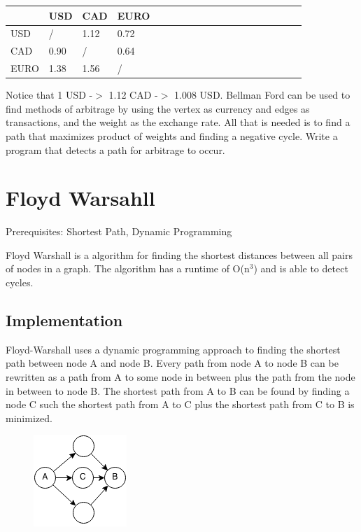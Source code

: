 \documentclass[11pt,oneside]{book}
\makeatletter
\def\maxwidth#1{\ifdim\Gin@nat@width>#1 #1\else\Gin@nat@width\fi}
\makeatother
\begin{document}
\begin{center}\begin{tabulary}{0.4\linewidth}{|l|l|l|l|l|l|l|l|l|l|l|l|l|l|l|l|l|l|l}\hline


   &
  USD &
  CAD &
  EURO\\
\hline


  USD &
  / &
  1.12 &
  0.72\\

  CAD &
  0.90 &
  / &
  0.64\\

  EURO &
  1.38 &
  1.56 &
  /\\

\hline\end{tabulary}\end{center}

Notice that 1 USD -$>$ 1.12 CAD -$>$ 1.008 USD. Bellman Ford can be used to find methods of arbitrage by using the vertex as currency and edges as transactions, and the weight as the exchange rate. All that is needed is to find a path that maximizes product of weights and finding a negative cycle. Write a program that detects a path for arbitrage to occur.

        \section{ Floyd Warsahll }
        

Prerequisites:  Shortest Path, Dynamic Programming

Floyd Warshall is a algorithm for finding the shortest distances between all pairs of nodes in a graph. The algorithm has a runtime of O(n$^{3}$) and is able to detect cycles.

\subsection{Implementation}

Floyd-Warshall uses a dynamic programming approach to finding the shortest path between node A and node B. Every path from node A to node B can be rewritten as a path from A to some node in between plus the path from the node in between to node B. The shortest path from A to B can be found by finding a node C such the shortest path from A to C plus the shortest path from C to B is minimized.

\vspace{5px}\begin{figure}[H]\centering
        \includegraphics[width=0.66\maxwidth{\textwidth}]{floydwarshall1.png}
        \end{figure}
\end{document}
